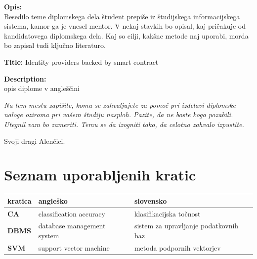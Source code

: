 \documentclass[a4paper,12pt,openright]{book}
\newcommand{\clearemptydoublepage}{\newpage{\pagestyle{empty}\cleardoublepage}}
\begin{document}
\bigskip
\noindent\textbf{Opis:}\\
Besedilo teme diplomskega dela študent prepiše iz študijskega informacijskega sistema, kamor ga je vnesel mentor. 
V nekaj stavkih bo opisal, kaj pričakuje od kandidatovega diplomskega dela. 
Kaj so cilji, kakšne metode naj uporabi, morda bo zapisal tudi ključno literaturo.

\bigskip
\noindent\textbf{Title:} Identity providers backed by smart contract

\bigskip
\noindent\textbf{Description:}\\
opis diplome v angleščini

\vfill



\vspace{2cm}

\clearemptydoublepage

\thispagestyle{empty}\mbox{}\vfill\null\it%
\noindent
Na tem mestu zapišite, komu se zahvaljujete za pomoč pri izdelavi diplomske naloge oziroma pri vašem študiju nasploh. Pazite, da ne boste koga pozabili. Utegnil vam bo zameriti. Temu se da izogniti tako, da celotno zahvalo izpustite.
\rm\normalfont

\clearemptydoublepage

\thispagestyle{empty}\mbox{}{\textheight}\mbox{}\hfill\begin{minipage}{0.55\textwidth}%
Svoji dragi Alenčici.
\normalfont\end{minipage}

\clearemptydoublepage


\pagestyle{empty}
\def\thepage{}%
\tableofcontents{}


\clearemptydoublepage


\chapter*{Seznam uporabljenih kratic}

\noindent\begin{tabular}{p{}|p{}|p{}}    %
  {\bf kratica} & {\bf angleško}                              & {\bf slovensko} \\ \hline
  {\bf CA}      & classification accuracy               & klasifikacijska točnost \\
  {\bf DBMS} & database management system & sistem za upravljanje podatkovnih baz \\
  {\bf SVM}   & support vector machine              & metoda podpornih vektorjev \\
\end{tabular}
\end{document}
